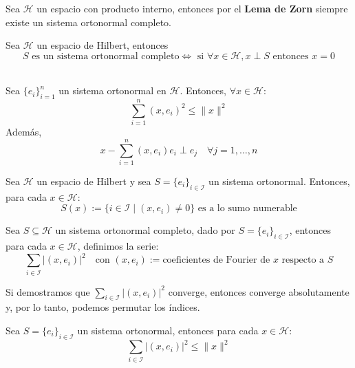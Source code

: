 \documentclass[12pt]{book}
\begin{document}
\begin{prop}
    Sea $\mathcal{H}$ un espacio con producto interno, entonces por el \textbf{Lema de Zorn} siempre existe un sistema ortonormal completo. 
\end{prop}

\begin{coro}
        Sea $\mathcal{H}$ un espacio de Hilbert, entonces 
    \begin{equation*}
        S \text{ es un sistema ortonormal completo} \iff \text{ si } \forall x \in \mathcal{H}, x \perp S \text{ entonces } x = 0
    \end{equation*} \\
\end{coro}
\begin{prop}
    Sea $\{e_i\}_{i=1}^{n}$ un sistema ortonormal en $\mathcal{H}$. Entonces, $\forall x \in \mathcal{H}$:
    \[ \sum_{i=1}^{n} (x, e_i)^2 \le \|x\|^2 \]
    Además, 
    $$x - \sum_{i=1}^{n} (x, e_i)e_i \perp e_j \quad \forall j=1, \dots, n$$
\end{prop}

\begin{prop}
    Sea $\mathcal{H}$ un espacio de Hilbert y sea $S = \{e_i\}_{i \in \mathcal{I}}$ un sistema ortonormal. Entonces, para cada $x \in \mathcal{H}$:
    \[ S(x) := \{ i \in \mathcal{I} \mid (x, e_i) \neq 0 \} \text{ es a lo sumo numerable} \]
\end{prop}

\begin{definicion}
    Sea $S \subseteq \mathcal{H}$ un sistema ortonormal completo, dado por $S = \{e_i\}_{i \in \mathcal{I}}$, entonces para cada $x \in \mathcal{H}$, definimos la serie:
    \[ \sum_{i \in \mathcal{I}} |(x, e_i)|^2 \quad \text{con } (x, e_i) := \text{coeficientes de Fourier de } x \text{ respecto a } S \]

\end{definicion}

\begin{observacion}
    Si demostramos que $\sum_{i \in \mathcal{I}} |(x, e_i)|^2$ converge, entonces converge absolutamente y, por lo tanto, podemos permutar los índices.
\end{observacion}


\begin{teo}
    Sea $S = \{e_i\}_{i \in \mathcal{I}}$ un sistema ortonormal, entonces para cada $x \in \mathcal{H}$: 
    \[ \sum_{i \in \mathcal{I}} |(x, e_i)|^2 \le \|x\|^2 \]
\end{teo}
\end{document}
